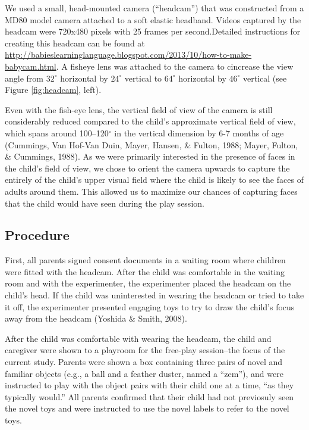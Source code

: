 \documentclass[10pt, letterpaper]{article}
\begin{document}
We used a small, head-mounted camera (``headcam'') that was constructed
from a MD80 model camera attached to a soft elastic headband. Videos
captured by the headcam were 720x480 pixels with 25 frames per
second.Detailed instructions for creating this headcam can be found at
\url{http://babieslearninglanguage.blogspot.com/2013/10/how-to-make-babycam.html}.
A fisheye lens was attached to the camera to cincrease the view angle
from \(32^{\circ}\) horizontal by \(24^{\circ}\) vertical to
\(64^{\circ}\) horizontal by \(46^{\circ}\) vertical (see Figure
\ref{fig:headcam}, left).

Even with the fish-eye lens, the vertical field of view of the camera is
still considerably reduced compared to the child's approximate vertical
field of view, which spans around 100--120\(^{\circ}\) in the vertical
dimension by 6-7 months of age (Cummings, Van Hof-Van Duin, Mayer,
Hansen, \& Fulton, 1988; Mayer, Fulton, \& Cummings, 1988). As we were
primarily interested in the presence of faces in the child's field of
view, we chose to orient the camera upwards to capture the entirely of
the child's upper visual field where the child is likely to see the
faces of adults around them. This allowed us to maximize our chances of
capturing faces that the child would have seen during the play session.

\subsection{Procedure}\label{procedure}

First, all parents signed consent documents in a waiting room where
children were fitted with the headcam. After the child was comfortable
in the waiting room and with the experimenter, the experimenter placed
the headcam on the child's head. If the child was uninterested in
wearing the headcam or tried to take it off, the experimenter presented
engaging toys to try to draw the child's focus away from the headcam
(Yoshida \& Smith, 2008).

After the child was comfortable with wearing the headcam, the child and
caregiver were shown to a playroom for the free-play session--the focus
of the current study. Parents were shown a box containing three pairs of
novel and familiar objects (e.g., a ball and a feather duster, named a
``zem''), and were instructed to play with the object pairs with their
child one at a time, ``as they typically would.'' All parents confirmed
that their child had not previosuly seen the novel toys and were
instructed to use the novel labels to refer to the novel toys.
\end{document}
